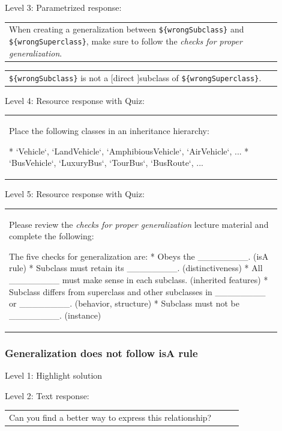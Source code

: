 \noindent Level 3: Parametrized response: \medskip

\begin{tabular}{|p{0.9\linewidth}}
When creating a generalization between \verb|${wrongSubclass}| and \verb|${wrongSuperclass}|, make sure to follow the \textit{checks for proper generalization}.
\end{tabular} \medskip

\begin{tabular}{|p{0.9\linewidth}}
\verb|${wrongSubclass}| is not a [direct ]subclass of \verb|${wrongSuperclass}|.
\end{tabular} \medskip

\noindent Level 4: Resource response with Quiz: \medskip

\begin{tabular}{|p{0.9\linewidth}}
Place the following classes in an inheritance hierarchy:

* `Vehicle`, `LandVehicle`, `AmphibiousVehicle`, `AirVehicle`, ...
* `BusVehicle`, `LuxuryBus`, `TourBus`, `BusRoute`, ...
\end{tabular} \medskip

\noindent Level 5: Resource response with Quiz: \medskip

\begin{tabular}{|p{0.9\linewidth}}
Please review the \textit{checks for proper generalization} lecture material
and complete the following:

The five checks for generalization are:
* Obeys the ________. (isA rule)
* Subclass must retain its ________. (distinctiveness)
* All ________ must make sense in each subclass. (inherited features)
* Subclass differs from superclass and other subclasses in ________ or ________. 
(behavior, structure)
* Subclass must not be ________. (instance)
\end{tabular} \medskip


\subsubsection{Generalization does not follow isA rule}

\noindent Level 1: Highlight solution \medskip

\noindent Level 2: Text response: \medskip

\begin{tabular}{|p{0.9\linewidth}}
Can you find a better way to express this relationship?
\end{tabular} \medskip

